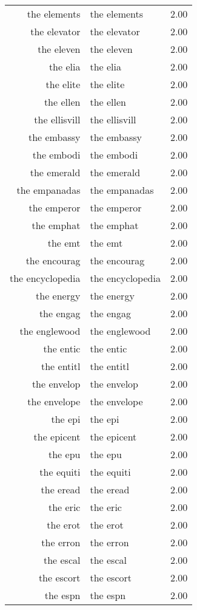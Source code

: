 \begin{table}[ht]
\begin{tabular}{rlr}
  the elements & the elements & 2.00 \\ 
  the elevator & the elevator & 2.00 \\ 
  the eleven & the eleven & 2.00 \\ 
  the elia & the elia & 2.00 \\ 
  the elite & the elite & 2.00 \\ 
  the ellen & the ellen & 2.00 \\ 
  the ellisvill & the ellisvill & 2.00 \\ 
  the embassy & the embassy & 2.00 \\ 
  the embodi & the embodi & 2.00 \\ 
  the emerald & the emerald & 2.00 \\ 
  the empanadas & the empanadas & 2.00 \\ 
  the emperor & the emperor & 2.00 \\ 
  the emphat & the emphat & 2.00 \\ 
  the emt & the emt & 2.00 \\ 
  the encourag & the encourag & 2.00 \\ 
  the encyclopedia & the encyclopedia & 2.00 \\ 
  the energy & the energy & 2.00 \\ 
  the engag & the engag & 2.00 \\ 
  the englewood & the englewood & 2.00 \\ 
  the entic & the entic & 2.00 \\ 
  the entitl & the entitl & 2.00 \\ 
  the envelop & the envelop & 2.00 \\ 
  the envelope & the envelope & 2.00 \\ 
  the epi & the epi & 2.00 \\ 
  the epicent & the epicent & 2.00 \\ 
  the epu & the epu & 2.00 \\ 
  the equiti & the equiti & 2.00 \\ 
  the eread & the eread & 2.00 \\ 
  the eric & the eric & 2.00 \\ 
  the erot & the erot & 2.00 \\ 
  the erron & the erron & 2.00 \\ 
  the escal & the escal & 2.00 \\ 
  the escort & the escort & 2.00 \\ 
  the espn & the espn & 2.00 \\ 

\end{tabular}
\end{table}
